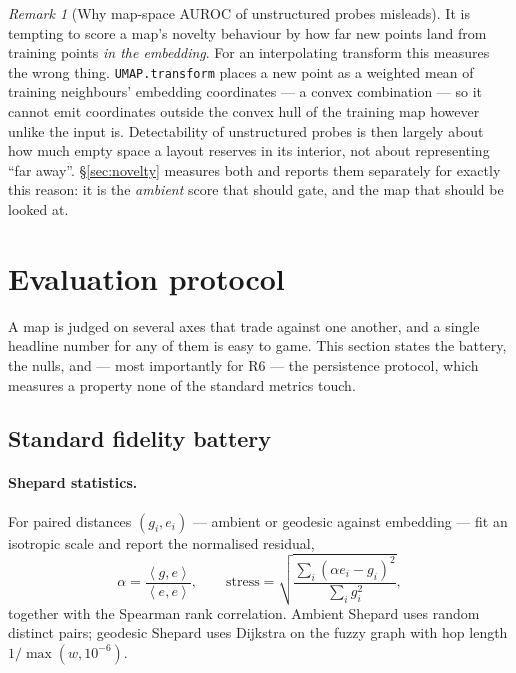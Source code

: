 \documentclass[12pt]{iopart}
\theoremstyle{definition}
\theoremstyle{plain}
\theoremstyle{remark}
\newtheorem{remark}{Remark}
\newcommand{\inner}[2]{\left\langle #1,#2\right\rangle}
\newcommand{\code}[1]{\texttt{#1}}
\begin{document}
\begin{remark}[Why map-space AUROC of unstructured probes misleads]
\label{rem:hull}
It is tempting to score a map's novelty behaviour by how far new points land
from training points \emph{in the embedding}. For an interpolating transform
this measures the wrong thing. \code{UMAP.transform} places a new point as a
weighted mean of training neighbours' embedding coordinates --- a convex
combination --- so it cannot emit coordinates outside the convex hull of the
training map however unlike the input is. Detectability of unstructured probes
is then largely about how much empty space a layout reserves in its interior,
not about representing ``far away''. \S\ref{sec:novelty} measures both and
reports them separately for exactly this reason: it is the \emph{ambient} score
that should gate, and the map that should be looked at.
\end{remark}

\section{Evaluation protocol}
\label{sec:eval}

A map is judged on several axes that trade against one another, and a single
headline number for any of them is easy to game. This section states the
battery, the nulls, and --- most importantly for R6 --- the persistence
protocol, which measures a property none of the standard metrics touch.

\subsection{Standard fidelity battery}
\label{sec:battery}

\paragraph{Shepard statistics.}
For paired distances $(g_i,e_i)$ --- ambient or geodesic against embedding ---
fit an isotropic scale and report the normalised residual,
\begin{equation}
\label{eq:shepard}
\alpha=\frac{\inner{g}{e}}{\inner{e}{e}},
\qquad
\mathrm{stress}=\sqrt{\frac{\sum_i(\alpha e_i-g_i)^2}{\sum_i g_i^2}},
\end{equation}
together with the Spearman rank correlation. Ambient Shepard uses random
distinct pairs; geodesic Shepard uses Dijkstra on the fuzzy graph with hop
length $1/\max(w,10^{-6})$.
\end{document}
